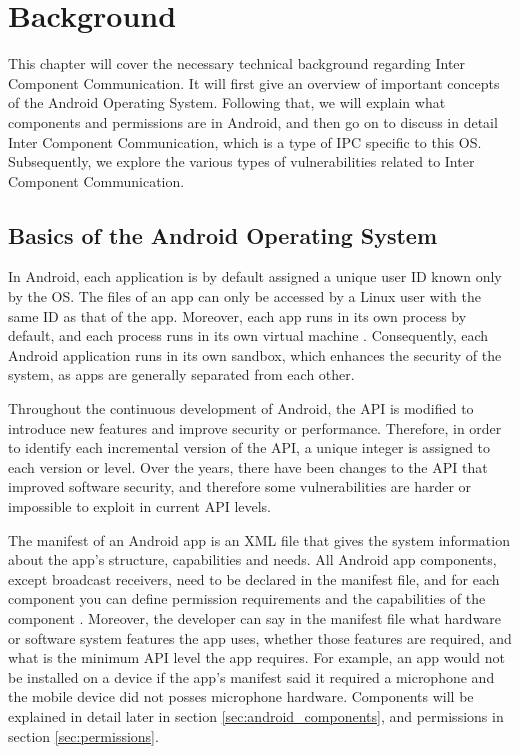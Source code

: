 \chapter{Background}
    \label{chap:background}

   This chapter will cover the necessary technical background regarding Inter Component Communication. It will first give an overview of important concepts of the Android Operating System. Following that, we will explain what components and permissions are in Android, and then go on to discuss in detail Inter Component Communication, which is a type of IPC specific to this OS. Subsequently, we explore the various types of vulnerabilities related to Inter Component Communication. 
    
    \section{Basics of the Android Operating System}
        \label{sec:android_basics}
    
    In Android, each application is by default assigned a unique user ID known only by the OS. The files of an app can only be accessed by a Linux user with the same ID as that of the app. Moreover, each app runs in its own process by default, and each process runs in its own virtual machine \cite{android_app_fundamentals}. Consequently, each Android application runs in its own sandbox, which enhances the security of the system, as apps are generally separated from each other.
    
    Throughout the continuous development of Android, the API is modified to introduce new features and improve security or performance. Therefore, in order to identify each incremental version of the API, a unique integer is assigned to each version or level. Over the years, there have been changes to the API that improved software security, and therefore some vulnerabilities are harder or impossible to exploit in current API levels.
    
    The manifest of an Android app is an XML file that gives the system information about the app’s structure, capabilities and needs. All Android app components, except broadcast receivers, need to be declared in the manifest file, and for each component you can define permission requirements and the capabilities of the component \cite{android_app_fundamentals}. Moreover, the developer can say in the manifest file what hardware or software system features the app uses, whether those features are required, and what is the minimum API level the app requires. For example, an app would not be installed on a device if the app’s manifest said it required a microphone and the mobile device did not posses microphone hardware.  Components will be explained in detail later in section \ref{sec:android_components}, and permissions in section \ref{sec:permissions}.
    
